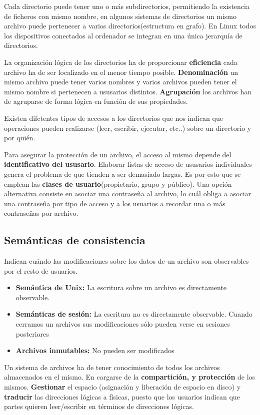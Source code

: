 Cada directorio puede tener uno o más subdirectorios, permitiendo la existencia de ficheros con mismo nombre, en algunos sistemas de directorios un mismo archivo puede pertenecer a varios directorios(estructura en grafo). En Linux todos los dispositivos conectados al ordenador se integran en una única jerarquía de directorios.

La organización lógica de los directorios ha de proporcionar \textbf{eficiencia} cada archivo ha de ser localizado en el menor tiempo posible. \textbf{Denominación} un mismo archivo puede tener varios nombres y varios archivos pueden tener el mismo nombre si pertenecen a ususarios distintos. \textbf{Agrupación} los archivos han de agruparse de forma lógica en función de sus propiedades.

Existen difetentes tipos de accesos a los directorios que nos indican que operaciones pueden realizarse (leer, escribir, ejecutar, etc..) sobre un directorio y por quién.

Para asegurar la protección de un archivo, el acceso al mismo depende del \textbf{identificativo del ususario}. Elaborar listas de acceso de ususarios individuales genera el problema de que tienden a ser demasiado largas. Es por esto que se emplean las \textbf{clases de usuario}(propietario, grupo y público). Una opción alternativa consiste en asociar una contraseña al archivo, lo cuál obliga a asociar una contraseña por tipo de acceso y a los usuarios a recordar una o más contraseñas por archivo.

\subsection*{Semánticas de consistencia}
Indican cuándo las modificaciones sobre los datos de un archivo son observables por el resto de usuarios.

\begin{itemize}
	\item\textbf{Semántica de Unix:} La escritura sobre un archivo es directamente observable.
	\item\textbf{Semánticas de sesión:} La escritura no es directamente observable. Cuando cerramos un archivos sus modificaciones sólo pueden verse en sesiones posteriores
	\item\textbf{Archivos inmutables:} No pueden ser modificados
\end{itemize}

Un sistema de archivos ha de tener conocimiento de todos los archivos almacenados en el mismo. En cargarse de la \textbf{compartición, y protección} de los mismos. \textbf{Gestionar} el espacio (asignación y liberación de espacio en disco) y \textbf{traducir} las direcciones lógicas a físicas, puesto que los usuarios indican que partes quieren leer/escribir en términos de direcciones lógicas.

